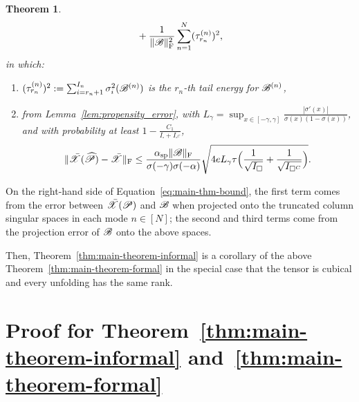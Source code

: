 \documentclass{article}
\newcommand{\T}[2][]{#1\mathscr{\MakeUppercase{#2}}}
\newcommand{\norm}[1]{\Vert #1 \Vert}
\newcommand{\fnorm}[1]{\norm{#1}_{\mathrm{F}}}
\def\Ph{\widehat P}
\theoremstyle{plain}
\newtheorem{theorem}{Theorem}
\begin{document}
\begin{theorem}
\begin{equation}
\begin{aligned}
			& + \frac{1}{\fnorm{\T{B}}^2} \sum_{n=1}^{N} (\tau_{r_n}^{(n)})^2, \\
		\end{aligned}
		\label{eq:main-thm-bound}
	\end{equation}
	in which:
	\begin{enumerate}
		\item $(\tau_{r_n}^{(n)})^2 := \sum_{i=r_n + 1}^{I_n} \sigma_i^2(\T{B}^{(n)})$ is the $r_n$-th tail energy for $\T{B}^{(n)}$,
		\item from Lemma~\ref{lem:propensity_error}, with $L_\gamma = \sup_{x\in[-\gamma,\gamma]} \frac{|\sigma'(x)|}{\sigma(x)(1-\sigma(x))}$, and with probability at least $1 - \frac{C_1}{I_\square + I_{\square^C}}$,
		\begin{equation}
			\label{eq:fnorm-error-on-exact-prop}
			\fnorm{\bar{\T{X}}(\T{\Ph}) - \bar{\T{X}}} \leq \frac{\alpha_\mathrm{sp} \fnorm{\T{B}}}{\sigma(-\gamma) \sigma(-\alpha)} \sqrt{4 e L_\gamma \tau \Big(\frac{1}{\sqrt{I_\square}}+\frac{1}{\sqrt{I_{\square^C}}}\Big)}.
		\end{equation}
	\end{enumerate}
\end{theorem}

On the right-hand side of Equation~\ref{eq:main-thm-bound}, the first term comes from the error between $\bar{\T{X}}(\T{P})$ and $\T{B}$ when projected onto the truncated column singular spaces in each mode $n \in [N]$; the second and third terms come from the projection error of $\T{B}$ onto the above spaces. 

Then, Theorem~\ref{thm:main-theorem-informal} is a corollary of the above Theorem~\ref{thm:main-theorem-formal} in the special case that the tensor is cubical and every unfolding has the same rank.

\section{Proof for Theorem~\ref{thm:main-theorem-informal} and~\ref{thm:main-theorem-formal}}
\label{sec:proof-for-main-theorem}
\end{document}
